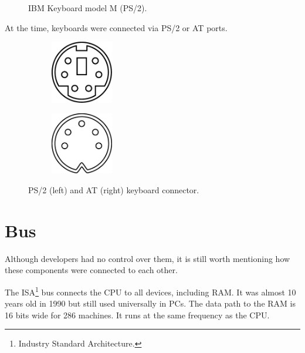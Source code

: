 \documentclass[book.tex]{subfiles}
\begin{document}
\begin{figure}[H] 
  \centering 
  \caption{IBM Keyboard model M (PS/2).}
\end{figure}

At the time, keyboards were connected via PS/2 or AT ports.\\

\par
\begin{figure}[H]
  \centering
  \begin{subfigure}{.5\textwidth}
    \centering
    \includegraphics[width=0.3\textwidth]{imgs/drawings/ports/MiniDIN-6_PS2.eps}
  \end{subfigure}%
  \begin{subfigure}{.5\textwidth}
    \centering
    \includegraphics[width=0.3\textwidth]{imgs/drawings/ports/AT_Diagram.eps}
  \end{subfigure}
  \caption{PS/2 (left) and AT (right) keyboard connector.}
  \label{fig:keyboard_connector}
\end{figure}

\pagebreak
\section{Bus}
Although developers had no control over them, it is still worth mentioning how these components were connected to each other.\\ 
\par

The ISA\footnote{Industry Standard Architecture.} bus connects the CPU to all devices, including RAM. It was almost 10 years old in 1990 but still used universally in PCs. The data path to the RAM is 16 bits wide for 286 machines. It runs at the same frequency as the CPU.\\
\par
\end{document}
